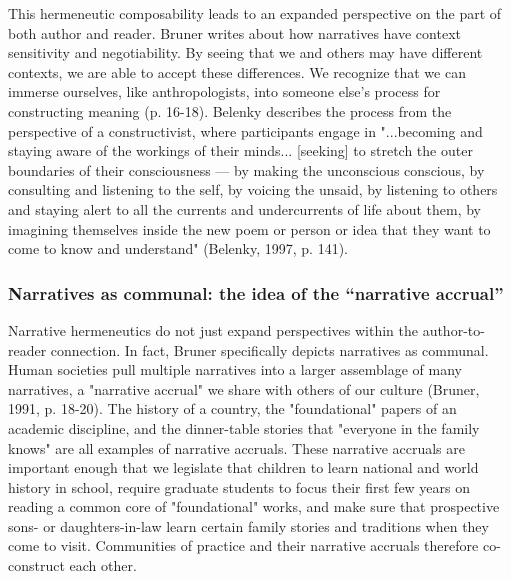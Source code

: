 This hermeneutic composability leads to an expanded perspective on the part of both author and reader. Bruner writes about how narratives have context sensitivity and negotiability. By seeing that we and others may have different contexts, we are able to accept these differences. We recognize that we can immerse ourselves, like anthropologists, into someone else's process for constructing meaning (p. 16-18). Belenky describes the process from the perspective of a constructivist, where participants engage in "...becoming and staying aware of the workings of their minds... [seeking] to stretch the outer boundaries of their consciousness — by making the unconscious conscious, by consulting and listening to the self, by voicing the unsaid, by listening to others and staying alert to all the currents and undercurrents of life about them, by imagining themselves inside the new poem or person or idea that they want to come to know and understand" (Belenky, 1997, p. 141).

\subsubsection{Narratives as communal: the idea of the “narrative accrual”}

Narrative hermeneutics do not just expand perspectives within the author-to-reader connection. In fact, Bruner specifically depicts narratives as communal. Human societies pull multiple narratives into a larger assemblage of many narratives, a "narrative accrual" we share with others of our culture (Bruner, 1991, p. 18-20). The history of a country, the "foundational" papers of an academic discipline, and the dinner-table stories that "everyone in the family knows" are all examples of narrative accruals. These narrative accruals are important enough that we legislate that children to learn national and world history in school, require graduate students to focus their first few years on reading a common core of "foundational" works, and make sure that prospective sons- or daughters-in-law learn certain family stories and traditions when they come to visit. Communities of practice and their narrative accruals therefore co-construct each other.

